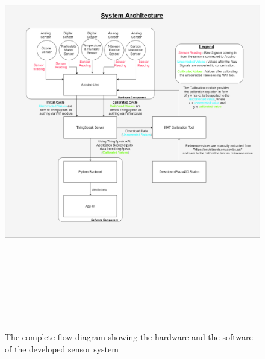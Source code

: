 \begin{figure}[h]
  \begin{center}
  \includegraphics[width=15.50cm,height=18.20cm]{images/figure68.png}
  \end{center}
  \caption{The complete flow diagram showing the hardware and the software of the developed sensor system}
  \label{flow}
  \hspace{1 cm}
\end{figure}


\clearpage

